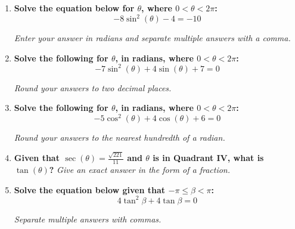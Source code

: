 \documentclass[12pt]{article}
\begin{document}
\begin{enumerate}
    \vspace{45mm}
    
    \item \textbf{Solve the equation below for \( \theta \), where \( 0 < \theta < 2\pi \):}
    \[ -8\sin^2(\theta) - 4 = -10 \]
    
    \textit{Enter your answer in radians and separate multiple answers with a comma.}
    \vspace{45mm}

    \item \textbf{Solve the following for \( \theta \), in radians, where \( 0 < \theta < 2\pi \):}
    \[ -7\sin^2(\theta) + 4\sin(\theta) + 7 = 0 \]
    
    \textit{Round your answers to two decimal places.}
    \vspace{45mm}
    \item \textbf{Solve the following for \( \theta \), in radians, where \( 0 < \theta < 2\pi \):}
    \[ -5\cos^2(\theta) + 4\cos(\theta) + 6 = 0 \]
    
    \textit{Round your answers to the nearest hundredth of a radian.}
    \vspace{45mm}

    \item \textbf{Given that \( \sec(\theta) = \frac{\sqrt{221}}{11} \) and \( \theta \) is in Quadrant IV, what is \( \tan(\theta) \)?}
    \textit{Give an exact answer in the form of a fraction.}
    \vspace{45mm}
    \newpage
    \item \textbf{Solve the equation below given that \( -\pi \leq \beta < \pi \):}
    \[ 4\tan^2 \beta + 4\tan \beta = 0 \]
    
    \textit{Separate multiple answers with commas.}
    \vspace{45mm}
\end{enumerate}
\end{document}
